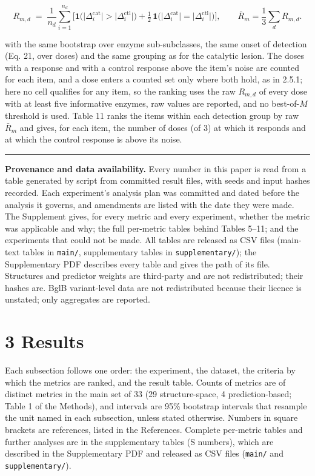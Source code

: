 \documentclass[
  10pt,
]{article}
\DeclareRobustCommand{\_}{\textunderscore\hspace{0pt}}
\begin{document}
\begin{equation*}R_{m,d} \;=\; \frac{1}{n_d}\sum_{i=1}^{n_d}\Big[\mathbf{1}\big(\lvert\Delta^{\mathrm{cat}}_{i}\rvert > \lvert\Delta^{\mathrm{ctl}}_{i}\rvert\big) + \tfrac{1}{2}\,\mathbf{1}\big(\lvert\Delta^{\mathrm{cat}}_{i}\rvert = \lvert\Delta^{\mathrm{ctl}}_{i}\rvert\big)\Big], \qquad \bar R_m = \frac{1}{3}\sum_{d} R_{m,d} . \tag{25}\end{equation*}

with the same
bootstrap over
enzyme
sub-subclasses, the
same onset of
detection (Eq. 21,
over doses) and the
same grouping as for
the catalytic
lesion. The doses
with a response and
with a control
response above the
item's noise are
counted for each
item, and a dose
enters a counted set
only where both
hold, as in 2.5.1;
here no cell
qualifies for any
item, so the ranking
uses the raw
\(R_{m,d}\) of every
dose with at least
five informative
enzymes, raw values
are reported, and no
best-of-\(M\)
threshold is used.
Table 11 ranks the
items within each
detection group by
raw \(\bar R_m\) and
gives, for each
item, the number of
doses (of 3) at
which it responds
and at which the
control response is
above its noise.

\begin{center}\rule{0.5\linewidth}{0.5pt}\end{center}

\textbf{Provenance
and data
availability.} Every
number in this paper
is read from a table
generated by script
from committed
result files, with
seeds and input
hashes recorded.
Each experiment's
analysis plan was
committed and dated
before the analysis
it governs, and
amendments are
listed with the date
they were made. The
Supplement gives,
for every metric and
every experiment,
whether the metric
was applicable and
why; the full
per-metric tables
behind Tables 5--11;
and the experiments
that could not be
made. All tables are
released as CSV
files (main-text
tables in
\texttt{main/},
supplementary tables
in
\texttt{supplementary/});
the Supplementary
PDF describes every
table and gives the
path of its file.
Structures and
predictor weights
are third-party and
are not
redistributed; their
hashes are. BglB
variant-level data
are not
redistributed
because their
licence is unstated;
only aggregates are
reported.

\section{3 Results}

Each subsection
follows one order:
the experiment, the
dataset, the
criteria by which
the metrics are
ranked, and the
result table. Counts
of metrics are of
distinct metrics in
the main set of 33
(29 structure-space,
4 prediction-based;
Table 1 of the
Methods), and
intervals are 95\%
bootstrap intervals
that resample the
unit named in each
subsection, unless
stated otherwise.
Numbers in square
brackets are
references, listed
in the References.
Complete per-metric
tables and further
analyses are in the
supplementary tables
(S numbers), which
are described in the
Supplementary PDF
and released as CSV
files
(\texttt{main/} and
\texttt{supplementary/}).
\end{document}
